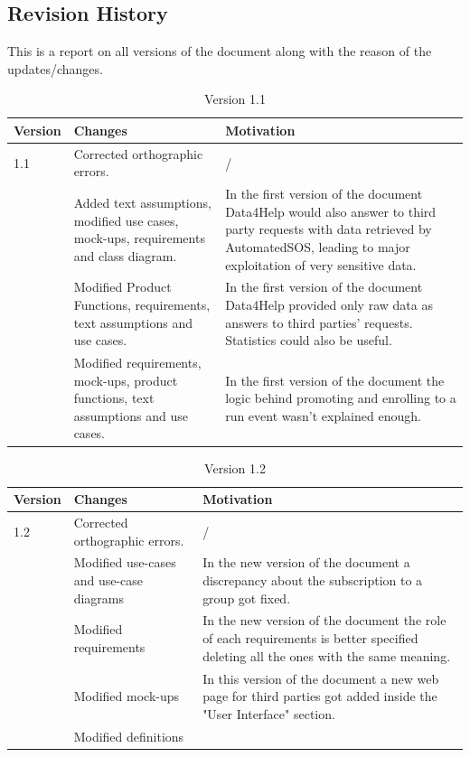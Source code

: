 \newpage
\subsection{Revision History}
This is a report on all versions of the document along with the reason of the updates/changes.

\begin{table}[h]
\begin{tabular}{|l|p{}|p{}|}
\hline
Version & Changes & Motivation\\ \hline
1.1     & Corrected orthographic errors. & / \\ \hline
 & Added text assumptions, modified use cases, mock-ups, requirements and class diagram. & In the first version of the document Data4Help would also answer to third party requests with data retrieved by AutomatedSOS, leading to major exploitation of very sensitive data.   \\ \hline
 & Modified Product Functions, requirements, text assumptions and use cases. & In the first version of the document Data4Help provided only raw data as answers to third parties' requests. Statistics could also be useful.  \\ \hline
 & Modified requirements, mock-ups, product functions, text assumptions and use cases. & In the first version of the document the logic behind promoting and enrolling to a run event wasn't explained enough. \\ \hline
\end{tabular}
\caption{Version 1.1}
\end{table}

\begin{table}[h]
\begin{tabular}{|l|p{}|p{}|}
\hline
Version & Changes & Motivation\\ \hline
1.2     & Corrected orthographic errors. & /  \\ \hline
& Modified use-cases and use-case diagrams & In the new version of the document a discrepancy about the subscription to a group got fixed.  \\ \hline
 & Modified requirements & In the new version of the document the role of each requirements is better specified deleting all the ones with the same meaning.   \\ \hline
 & Modified mock-ups & In this version of the document a new web page for third parties got added inside the "User Interface" section. \\ \hline
  & Modified definitions & \ \\ \hline
\end{tabular}
\caption{Version 1.2}
\end{table}

